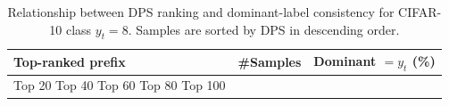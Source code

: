 \begin{table}[t]
\centering
\begin{tabular}{lrr}
\toprule
Top-ranked prefix & \#Samples & Dominant $= y_t$ (\%) \\
\midrule
Top 20%
Top 40%
Top 60%
Top 80%
Top 100%
\bottomrule
\caption{Relationship between DPS ranking and dominant-label consistency for CIFAR-10 class $y_t=8$. Samples are sorted by DPS in descending order.}
\label{tab:class_8_prefix}
\end{tabular}
\end{table}
